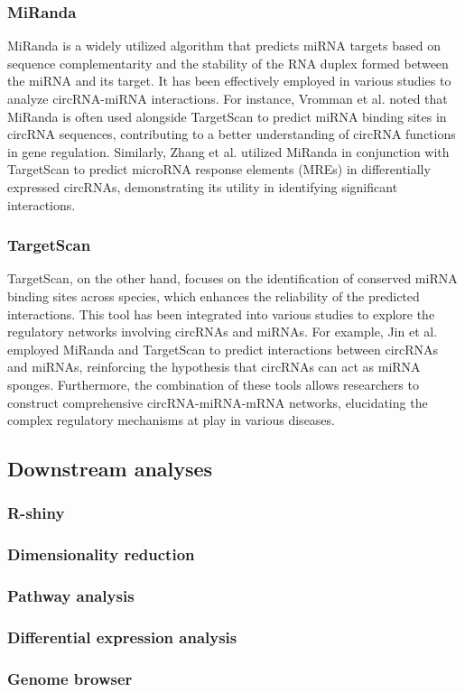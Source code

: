 \subsubsection{MiRanda}
MiRanda is a widely utilized algorithm that predicts miRNA targets based on
sequence complementarity and the stability of the RNA duplex formed between the
miRNA and its target.
It has been effectively employed in various studies to analyze circRNA-miRNA
interactions.
For instance, Vromman et al.
noted that
MiRanda is often used alongside TargetScan to predict miRNA binding sites in
circRNA sequences, contributing to a better understanding of circRNA functions
in gene regulation\supercite{vromman_closing_2021}.
Similarly, Zhang et al.
utilized
MiRanda in conjunction with TargetScan to predict microRNA response elements
(MREs) in differentially expressed circRNAs, demonstrating its utility in
identifying significant interactions\supercite{zhang_microarray_2017}.

\subsubsection{TargetScan}
TargetScan, on the other hand, focuses on the identification of conserved miRNA
binding sites across species, which enhances the reliability of the predicted
interactions.
This tool has been integrated into various studies to explore the regulatory
networks involving circRNAs and miRNAs.
For example, Jin et al.
employed MiRanda and TargetScan to predict interactions between circRNAs and
miRNAs, reinforcing the hypothesis that circRNAs can act as miRNA
sponges\supercite{jin_changes_2018}.
Furthermore, the combination of these tools allows researchers to construct
comprehensive circRNA-miRNA-mRNA networks, elucidating the complex regulatory
mechanisms at play in various
diseases\supercite{he_construction_2021,zhang_construction_2021}.

\subsection{Downstream analyses}
\subsubsection{R-shiny}
\subsubsection{Dimensionality reduction}
\subsubsection{Pathway analysis}
\subsubsection{Differential expression analysis}
\subsubsection{Genome browser}
